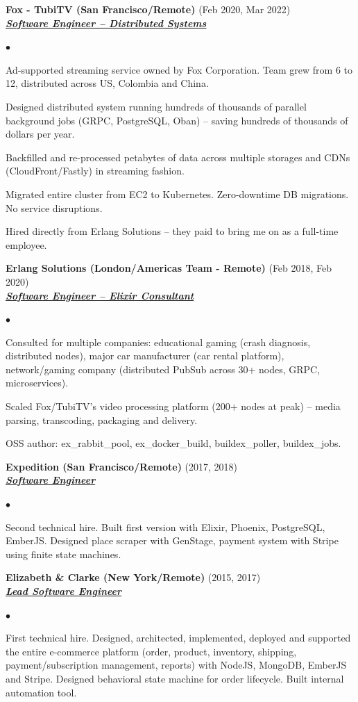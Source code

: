 \documentclass[a4paper]{article}
\newcommand{\employer}[3]{{
  \textbf{#1} (#2)\\ \underline{\textbf{\emph{#3}}}\\ }}
\newenvironment{achievements}{\begin{list}{$\bullet$}{\topsep 0pt \itemsep
  -2pt}}{\vspace*{4pt}\end{list}}
\begin{document}
  \employer{ Fox - TubiTV (San Francisco/Remote)}{Feb 2020, Mar 2022}{Software Engineer -- Distributed Systems}
  \begin{achievements}
  \item Ad-supported streaming service owned by Fox Corporation. Team grew from 6 to 12, distributed across US, Colombia and China.
  \item Designed distributed system running hundreds of thousands of parallel background jobs (GRPC, PostgreSQL, Oban) -- saving hundreds of thousands of dollars per year.
  \item Backfilled and re-processed petabytes of data across multiple storages and CDNs (CloudFront/Fastly) in streaming fashion.
  \item Migrated entire cluster from EC2 to Kubernetes. Zero-downtime DB migrations. No service disruptions.
  \item Hired directly from Erlang Solutions -- they paid to bring me on as a full-time employee.
  \end{achievements}

  \employer{ Erlang Solutions (London/Americas Team - Remote)}{Feb 2018, Feb 2020}{Software Engineer -- Elixir Consultant}
  \begin{achievements}
  \item Consulted for multiple companies: educational gaming (crash diagnosis, distributed nodes), major car manufacturer (car rental platform), network/gaming company (distributed PubSub across 30+ nodes, GRPC, microservices).
  \item Scaled Fox/TubiTV's video processing platform (200+ nodes at peak) -- media parsing, transcoding, packaging and delivery.
  \item OSS author: ex\_rabbit\_pool, ex\_docker\_build, buildex\_poller, buildex\_jobs.
  \end{achievements}

  \employer{ Expedition (San Francisco/Remote)}{2017, 2018}{Software Engineer}
  \begin{achievements}
  \item Second technical hire. Built first version with Elixir, Phoenix, PostgreSQL, EmberJS. Designed place scraper with GenStage, payment system with Stripe using finite state machines.
  \end{achievements}

  \employer{ Elizabeth \& Clarke (New York/Remote)}{2015, 2017}{Lead Software Engineer}
  \begin{achievements}
  \item First technical hire. Designed, architected, implemented, deployed and supported the entire e-commerce platform (order, product, inventory, shipping, payment/subscription management, reports) with NodeJS, MongoDB, EmberJS and Stripe. Designed behavioral state machine for order lifecycle. Built internal automation tool.
  \end{achievements}
\end{document}
